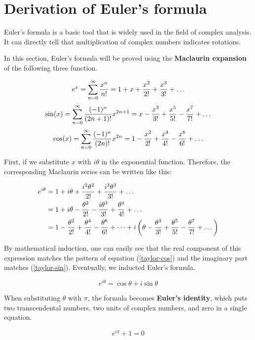 \section{Derivation of Euler's formula}

Euler's formula is a basic tool that is widely used in the field of complex
analysis. It can directly tell that multiplication of complex numbers indicates
rotations.

In this section, Euler's formula will be proved using the \textbf{Maclaurin
expansion} of the following three function.

\begin{equation}
	e^x=\sum_{n=0}^\infty{x^n\over n!}
	=1+x+{x^2\over2!}+{x^3\over3!}+\dots
	\label{taylor-exp}
\end{equation}
\begin{equation}
	\sin(x)=\sum_{n=0}^\infty{(-1)^n\over(2n+1)!}x^{2n+1}
	=x-{x^3\over3!}+{x^5\over5!}-{x^7\over7!}+\dots
	\label{taylor-sin}
\end{equation}
\begin{equation}
	\cos(x)=\sum_{n=0}^\infty{(-1)^n\over(2n)!}x^{2n}
	=1-{x^2\over2!}+{x^4\over4!}-{x^6\over6!}+\dots
	\label{taylor-cos}
\end{equation}

First, if we substitute $x$ with $i\theta$ in the exponential function.
Therefore, the corresponding Maclaurin series can be written like this:

$$
\begin{aligned}
	e^{i\theta}
	&=1+i\theta+{i^2\theta^2\over2!}+{i^3\theta^3\over3!}+\dots \\
	&=1+i\theta-{\theta^2\over2!}-{i\theta^3\over3!}+{\theta^4\over4!}
	+\dots \\
	&=1-{\theta^2\over2!}+{\theta^4\over4!}-{\theta^6\over6!}+\dots
	+i\left(\theta-{\theta^3\over3!}+{\theta^5\over5!}-{\theta^7\over7!}
	+\dots\right)
\end{aligned}
$$

By mathematical induction, one can easily see that the real component of this
expression matches the pattern of equation (\ref{taylor-cos}) and the imaginary
part matches (\ref{taylor-sin}). Eventually, we inducted Euler's formula.

$$e^{i\theta}=\cos\theta+i\sin\theta$$

When substituting $\theta$ with $\pi$, the formula becomes \textbf{Euler's
identity}, which puts two transcendental numbers, two units of complex numbers,
and zero in a single equation.

$$e^{i\pi}+1=0$$
